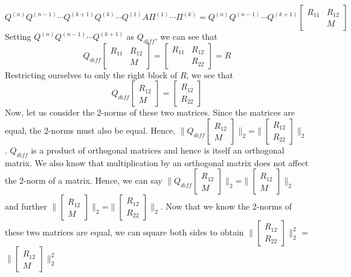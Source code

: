 \documentclass[12pt]{article}
\begin{document}
\begin{equation*}
    Q^{(n)}Q^{(n-1)}\cdots Q^{(k+1)}Q^{(k)}\cdots Q^{(1)}A\Pi^{(1)}\cdots\Pi^{(k)} = Q^{(n)}Q^{(n-1)}\cdots Q^{(k+1)}\begin{bmatrix} R_{11} & R_{12} \\ & M\end{bmatrix}
\end{equation*}
Setting $Q^{(n)}Q^{(n-1)}\cdots Q^{(k+1)}$ as $Q_{diff}$, we can see that \[Q_{diff} \begin{bmatrix} R_{11} & R_{12} \\ & M\end{bmatrix}=\begin{bmatrix} R_{11} & R_{12} \\ & R_{22}\end{bmatrix}=R\]
Restricting ourselves to only the right block of $R$, we see that \[Q_{diff} \begin{bmatrix}R_{12} \\ M\end{bmatrix}=\begin{bmatrix} R_{12} \\ R_{22}\end{bmatrix}\]
Now, let us consider the 2-norms of these two matrices. Since the matrices are equal, the 2-norms must also be equal. Hence, $\|Q_{diff} \begin{bmatrix}R_{12} \\ M\end{bmatrix}\|_2$=$\|\begin{bmatrix} R_{12} \\ R_{22}\end{bmatrix}\|_2$. $Q_{diff}$ is a product of orthogonal matrices and hence is itself an orthogonal matrix. We also know that multiplication by an orthogonal matrix does not affect the 2-norm of a matrix. Hence, we can say $\|Q_{diff} \begin{bmatrix}R_{12} \\ M\end{bmatrix}\|_2$=$\|\begin{bmatrix} R_{12} \\ M\end{bmatrix}\|_2$ and further $\|\begin{bmatrix} R_{12} \\ M\end{bmatrix}\|_2$=$\|\begin{bmatrix} R_{12} \\ R_{22}\end{bmatrix}\|_2$. Now that we know the 2-norms of these two matrices are equal, we can square both sides to obtain ${\| \begin{bmatrix}
                R_{12} \\
                R_{22}
            \end{bmatrix} \|^2_2}$ = ${\| \begin{bmatrix}
                R_{12} \\
                M
            \end{bmatrix} \|^2_2}$
\end{document}
